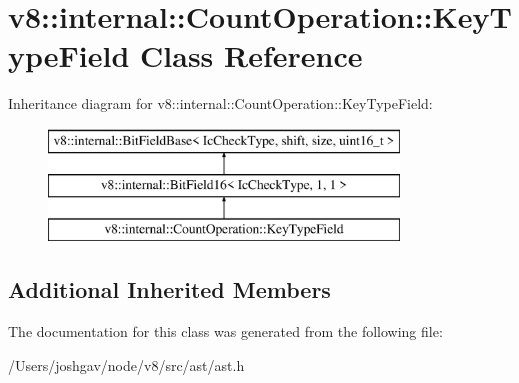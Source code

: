 \hypertarget{classv8_1_1internal_1_1_count_operation_1_1_key_type_field}{}\section{v8\+:\+:internal\+:\+:Count\+Operation\+:\+:Key\+Type\+Field Class Reference}
\label{classv8_1_1internal_1_1_count_operation_1_1_key_type_field}
Inheritance diagram for v8\+:\+:internal\+:\+:Count\+Operation\+:\+:Key\+Type\+Field\+:\begin{figure}[H]
\begin{center}
\leavevmode
\includegraphics[height=3.000000cm]{classv8_1_1internal_1_1_count_operation_1_1_key_type_field}
\end{center}
\end{figure}
\subsection*{Additional Inherited Members}


The documentation for this class was generated from the following file\+:\begin{DoxyCompactItemize}
\item 
/\+Users/joshgav/node/v8/src/ast/ast.\+h\end{DoxyCompactItemize}
